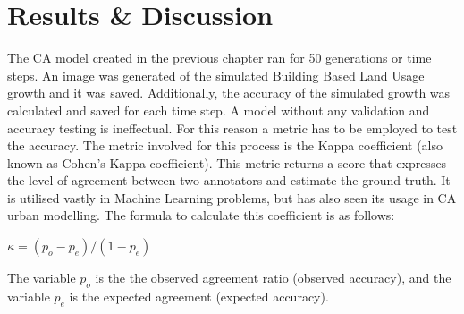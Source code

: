 \chapter{Results \& Discussion} %
\label{Chapter4} %
The CA model created in the previous chapter ran for 50 generations or time steps. An image was generated of the simulated Building Based Land Usage growth and it was saved. Additionally, the accuracy of the simulated growth was calculated and saved for each time step. A model without any validation and accuracy testing is ineffectual. For this reason a metric has to be employed to test the accuracy. The metric involved for this process is the Kappa coefficient (also known as Cohen's Kappa coefficient). This metric returns a score that expresses the level of agreement between two annotators and estimate the ground truth. It is utilised vastly in Machine Learning problems, but has also seen its usage in CA urban modelling\cite{m1,m2,m3,m4,m5,m6,m7,m8,m9}. The formula to calculate this coefficient is as follows:\cite{sklearn}
\begin{center}
$\kappa = (p_o - p_e) / (1 - p_e)$
\end{center}
The variable $p_o$ is the the observed agreement ratio (observed accuracy), and the variable $p_e$ is the expected agreement (expected accuracy).

